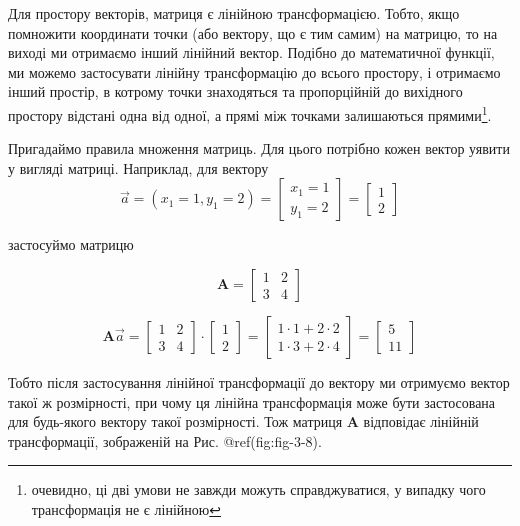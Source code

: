 \documentclass[
  11pt,
]{book}
\begin{document}
Для простору векторів, матриця є лінійною трансформацією. Тобто, якщо
помножити координати точки (або вектору, що є тим самим) на матрицю, то
на виході ми отримаємо інший лінійний вектор. Подібно до математичної
функції, ми можемо застосувати лінійну трансформацію до всього простору,
і отримаємо інший простір, в котрому точки знаходяться та пропорційній
до вихідного простору відстані одна від одної, а прямі між точками
залишаються прямими\footnote{очевидно, ці дві умови не завжди можуть
  справджуватися, у випадку чого трансформація не є лінійною}.

Пригадаймо правила множення матриць. Для цього потрібно кожен вектор
уявити у вигляді матриці. Наприклад, для вектору
\[\vec{a} = (x_1 = 1, y_1 = 2) = \begin{bmatrix} 
x_1 = 1 \\ 
y_1 = 2 \end{bmatrix} = \begin{bmatrix}
1 \\
2 \end{bmatrix}\]

застосуймо матрицю

\[\mathbf{A} = \begin{bmatrix}
1 & 2 \\
3 & 4
\end{bmatrix}\]

\[
\mathbf{A} \vec{a} = \begin{bmatrix}
1 & 2 \\
3 & 4
\end{bmatrix} \cdot \begin{bmatrix}
1 \\ 2 
\end{bmatrix}= \begin{bmatrix}
1 \cdot 1 + 2 \cdot 2 \\
1 \cdot 3 + 2 \cdot 4
\end{bmatrix} = \begin{bmatrix}
5 \\ 11
\end{bmatrix}
\]

Тобто після застосування лінійної трансформації до вектору ми отримуємо
вектор такої ж розмірності, при чому ця лінійна трансформація може бути
застосована для будь-якого вектору такої розмірності. Тож матриця
\(\mathbf{A}\) відповідає лінійній трансформації, зображеній на Рис.
@ref(fig:fig-3-8).
\end{document}
